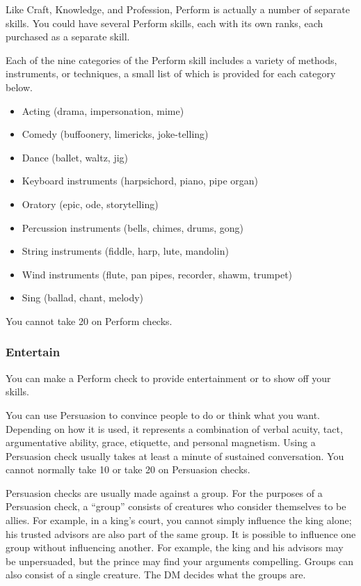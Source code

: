 \par Like Craft, Knowledge, and Profession, Perform is actually a number of separate skills. You could have several Perform skills, each with its own ranks, each purchased as a separate skill.

Each of the nine categories of the Perform skill includes a variety of methods, instruments, or techniques, a small list of which is provided for each category below.
\begin{itemize}
\item Acting (drama, impersonation, mime)
\item Comedy (buffoonery, limericks, joke-telling)
\item Dance (ballet, waltz, jig)
\item Keyboard instruments (harpsichord, piano, pipe organ)
\item Oratory (epic, ode, storytelling)
\item Percussion instruments (bells, chimes, drums, gong)
\item String instruments (fiddle, harp, lute, mandolin)
\item Wind instruments (flute, pan pipes, recorder, shawm, trumpet)
\item Sing (ballad, chant, melody)
\end{itemize}

You cannot take 20 on Perform checks.

\subsubsection{Entertain}
You can make a Perform check to provide entertainment or to show off your skills.

You can use Persuasion to convince people to do or think what you want. Depending on how it is used, it represents a combination of verbal acuity, tact, argumentative ability, grace, etiquette, and personal magnetism. Using a Persuasion check usually takes at least a minute of sustained conversation. You cannot normally take 10 or take 20 on Persuasion checks.

Persuasion checks are usually made against a group. For the purposes of a Persuasion check, a ``group'' consists of creatures who consider themselves to be allies. For example, in a king's court, you cannot simply influence the king alone; his trusted advisors are also part of the same group. It is possible to influence one group without influencing another. For example, the king and his advisors may be unpersuaded, but the prince may find your arguments compelling. Groups can also consist of a single creature. The DM decides what the groups are.

